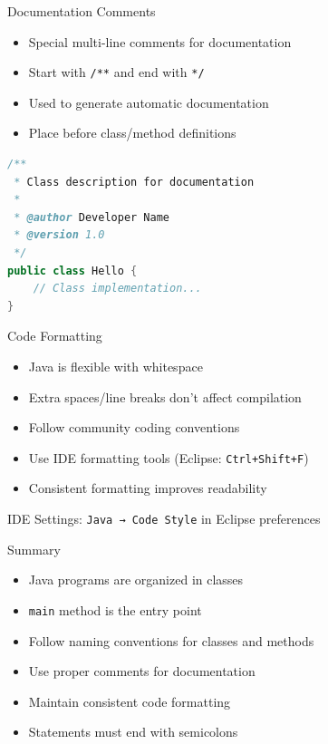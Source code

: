 \documentclass[serif, aspectratio=169]{beamer}
\begin{document}
\begin{frame}[fragile]{Documentation Comments}
\begin{itemize}
    \item Special multi-line comments for documentation
    \item Start with \texttt{/**} and end with \texttt{*/}
    \item Used to generate automatic documentation
    \item Place before class/method definitions
\end{itemize}

\begin{lstlisting}[language=Java]
/**
 * Class description for documentation
 * 
 * @author Developer Name
 * @version 1.0
 */
public class Hello {
    // Class implementation...
}
\end{lstlisting}
\end{frame}

\begin{frame}[fragile]{Code Formatting}
\begin{itemize}
    \item Java is flexible with whitespace
    \item Extra spaces/line breaks don't affect compilation
    \item Follow community coding conventions
    \item Use IDE formatting tools (Eclipse: \texttt{Ctrl+Shift+F})
    \item Consistent formatting improves readability
\end{itemize}

\begin{block}{IDE Settings:}
\texttt{Java → Code Style} in Eclipse preferences
\end{block}
\end{frame}

\begin{frame}[fragile]{Summary}
\begin{itemize}
    \item Java programs are organized in classes
    \item \texttt{main} method is the entry point
    \item Follow naming conventions for classes and methods
    \item Use proper comments for documentation
    \item Maintain consistent code formatting
    \item Statements must end with semicolons
\end{itemize}
\end{frame}
\end{document}
